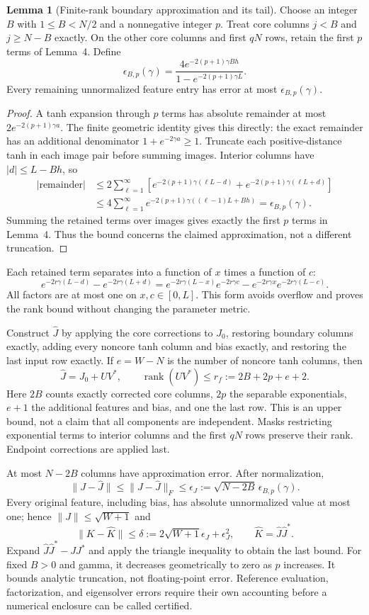 \documentclass[11pt]{article}
\DeclareMathOperator{\rank}{rank}
\theoremstyle{definition}
\newtheorem{lemma}{Lemma}
\begin{document}
\begin{lemma}[Finite-rank boundary approximation and its tail]
Choose an integer $B$ with $1\le B<N/2$ and a nonnegative integer $p$.
Treat core columns $j<B$ and $j\ge N-B$ exactly. On the other core columns
and first $qN$ rows, retain the first $p$ terms of Lemma~4. Define
\[
\epsilon_{B,p}(\gamma)=
\frac{4e^{-2(p+1)\gamma Bh}}{1-e^{-2(p+1)\gamma L}}.
\]
Every remaining unnormalized feature entry has error at most
$\epsilon_{B,p}(\gamma)$.
\end{lemma}
\begin{proof}
A tanh expansion through $p$ terms has absolute remainder at most
$2e^{-2(p+1)\gamma a}$. The finite geometric identity gives this directly:
the exact remainder has an additional denominator
$1+e^{-2\gamma a}\ge1$. Truncate each positive-distance tanh in each image
pair before summing images. Interior columns have $|d|\le L-Bh$, so
\begin{align*}
|\mathrm{remainder}|
&\le2\sum_{\ell=1}^\infty
\left[e^{-2(p+1)\gamma(\ell L-d)}
+e^{-2(p+1)\gamma(\ell L+d)}\right]\\
&\le4\sum_{\ell=1}^\infty
e^{-2(p+1)\gamma((\ell-1)L+Bh)}
=\epsilon_{B,p}(\gamma).
\end{align*}
Summing the retained terms over images gives exactly the first $p$ terms
in Lemma~4. Thus the bound concerns the claimed approximation, not a
different truncation.
\end{proof}
Each retained term separates into a function of $x$ times a function of $c$:
\[
e^{-2r\gamma(L-d)}-e^{-2r\gamma(L+d)}
=e^{-2r\gamma(L-x)}e^{-2r\gamma c}
-e^{-2r\gamma x}e^{-2r\gamma(L-c)}.
\]
All factors are at most one on $x,c\in[0,L]$. This form avoids overflow and
proves the rank bound without changing the parameter metric.

Construct $\widehat J$ by applying the core corrections to $J_0$, restoring
boundary columns exactly, adding every noncore tanh column and bias exactly,
and restoring the last input row exactly. If $e=W-N$ is the number of
noncore tanh columns, then
\[
\widehat J=J_0+UV^*,\qquad
\rank(UV^*)\le r_f:=2B+2p+e+2.
\]
Here $2B$ counts exactly corrected core columns, $2p$ the separable
exponentials, $e+1$ the additional features and bias, and one the last row.
This is an upper bound, not a claim that all components are independent.
Masks restricting exponential terms to interior columns and the first
$qN$ rows preserve their rank. Endpoint corrections are applied last.

At most $N-2B$ columns have approximation error. After normalization,
\[
\|J-\widehat J\|\le\|J-\widehat J\|_F
\le\epsilon_J:=\sqrt{N-2B}\,\epsilon_{B,p}(\gamma).
\]
Every original feature, including bias, has absolute unnormalized value
at most one; hence $\|J\|\le\sqrt{W+1}$ and
\[
\|K-\widehat K\|\le
\delta:=2\sqrt{W+1}\epsilon_J+\epsilon_J^2,
\qquad\widehat K=\widehat J\widehat J^*.
\]
Expand $\widehat J\widehat J^*-JJ^*$ and apply the triangle inequality to
obtain the last bound. For fixed $B>0$ and gamma, it decreases geometrically
to zero as $p$ increases. It bounds analytic truncation, not floating-point
error. Reference evaluation, factorization, and eigensolver errors require
their own accounting before a numerical enclosure can be called certified.
\end{document}
